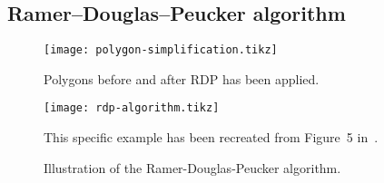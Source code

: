 \subsection{Ramer–Douglas–Peucker algorithm}

\begin{figure}[H]
  \centering
  \texttt{[image: polygon-simplification.tikz]}
  \caption{Polygons before and after RDP has been applied.}
\end{figure}

\begin{figure}
  \centering
  \texttt{[image: rdp-algorithm.tikz]}
  \caption{%
    Illustration of the Ramer-Douglas-Peucker algorithm.
  }{%
    This specific example has been recreated from Figure~5 in~\cite{original-rdp-figure}.
  }
  \label{}
\end{figure}
